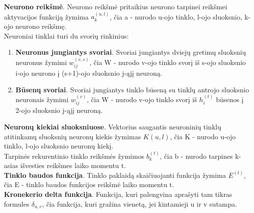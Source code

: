 \textbf{Neurono reikšmė}. Neurono reikšmė pritaikius neurono tarpinei reikšmei aktyvacijos funkciją žymima $a_k^{(u,l)}$, čia a - nurodo u-ojo tinklo, l-ojo sluoksnio, k-ojo neurono reikšmę.\\

Neuroniai tinklai turi du svorių rinkinius:
\begin{enumerate}
  \item \textbf{Neuronus jungiantys svoriai}. Svoriai jungiantys dviejų gretimų sluoksnių neuronus žymimi $w_{ij}^{(v,s)}$, čia W - nurodo v-ojo tinklo svorį iš s-ojo sluoksnio i-ojo neurono į (s+1)-ojo sluoksnio j-ąjį neuroną.
  \item \textbf{Būsenų svoriai}. Svoriai jungiantys tinklo būseną su tinklų antrojo sluoksnio neuronais žymimi $w_{ij}^{(v)}$, čia W - nurodo v-ojo tinklo svorį iš $h_i^{(t)}$ būsenos į 2-ojo sluoksnio j-ąjį neuroną.\\
\end{enumerate}
%

\textbf{Neuronų kiekiai sluoksniuose}. Vektorius saugantis neuroninių tinklų atitinkamų sluoksnių neuronų kiekis žymimas $K(u,l)$, čia K - nurodo u-ojo tinklo, l-ojo sluoksnio neuronų kiekį. \\

Tarpinės rekurentinio tinklo reikšmės žymimos $b_k^{(t)}$, čia b - nurodo tarpines k-asias išvesties reikšmes laiko momentu t.\\

\textbf{Tinklo baudos funkcija}. Tinklo paklaidą skaičiuojanti funkcija žymima $E^{(t)}$, čia E - tinklo baudos funkcijos reikšmė laiko momentu t.\\

\textbf{Kronekerio delta funkcija}. Funkcija, kuri palengvina aprašyti tam tikras formules $\delta_{u,v}$, čia funkcija, kuri gražina vienetą, jei kintamieji u ir v sutampa. \\

